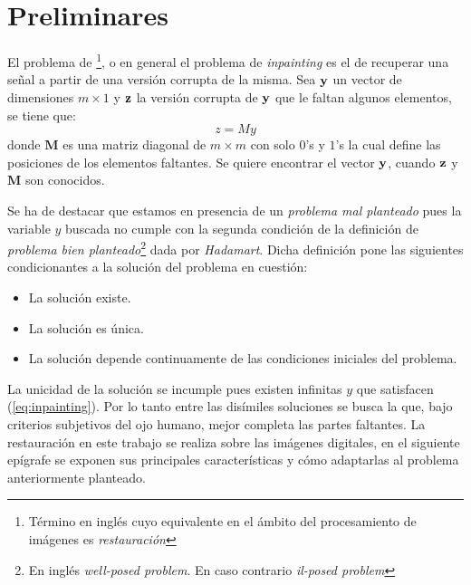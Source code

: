 \chapter{Preliminares}\label{chapter:background}

\begin{definition}\label{def:inpainting}
	El problema de \II\footnote{T\'ermino en ingl\'es cuyo equivalente en el \'ambito del procesamiento de im\'agenes es \textit{restauraci\'on}}, o en general el problema de \textit{inpainting} es el de recuperar una señal a partir de una versi\'on corrupta de la misma. Sea $\mathbf{y}$ un vector de dimensiones $m \times 1$ y $\mathbf{z}$ la versi\'on corrupta de $\mathbf{y}$ que le faltan algunos elementos, se tiene que:
	\begin{equation}
		z = My
		\label{eq:inpainting}
	\end{equation}
	donde $\mathbf{M}$ es una matriz diagonal de $m \times m$ con solo $0$'s y $1$'s la cual define las posiciones de los elementos faltantes. Se quiere encontrar el vector $\mathbf{y}$, cuando $\mathbf{z}$ y  $\mathbf{M}$ son conocidos. 
\end{definition}

Se ha de destacar que estamos en presencia de un \textit{problema mal planteado} pues la variable $y$ buscada no cumple con la segunda condición de la definición de \textit{problema bien planteado}\footnote{En ingl\'es \textit{well-posed problem}. En caso contrario \textit{il-posed problem}} \cite{enwiki:wpp} dada por \textit{Hadamart}. Dicha definición pone las siguientes condicionantes a la soluci\'on  del problema en cuestión:
\begin{itemize}
	\item La soluci\'on existe.
	\item La soluci\'on es \'unica.
	\item La soluci\'on depende continuamente de las condiciones iniciales del problema.
\end{itemize}
La unicidad de la soluci\'on se incumple pues existen infinitas $y$ que satisfacen (\ref{eq:inpainting}). Por lo tanto entre las dis\'imiles soluciones se busca la que, bajo criterios subjetivos del ojo humano, mejor completa las partes faltantes. La restauraci\'on en este trabajo se realiza sobre las im\'agenes digitales, en el siguiente ep\'igrafe se exponen sus principales características y c\'omo adaptarlas al problema anteriormente planteado. 

